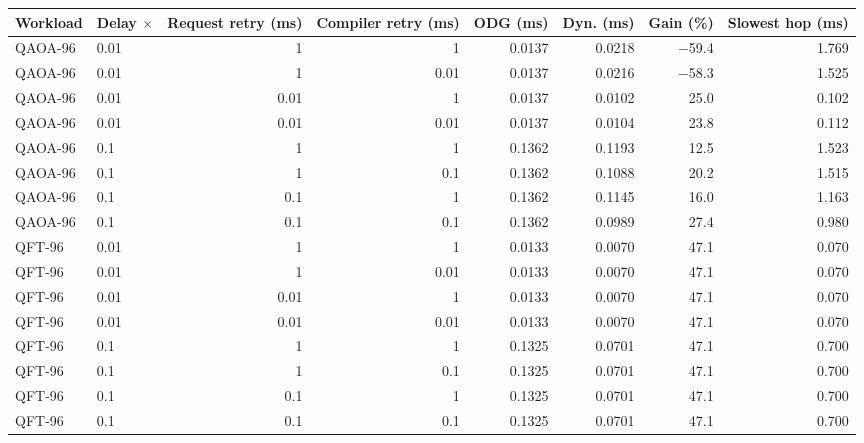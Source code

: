 \begin{tabular}{llrrrrrr}
\toprule
Workload & Delay $\times$ & Request retry (ms) & Compiler retry (ms) & ODG (ms) & Dyn. (ms) & Gain (\%) & Slowest hop (ms) \\
\midrule
QAOA-96 & 0.01 & 1 & 1 & 0.0137 & 0.0218 & $-$59.4 & 1.769 \\
QAOA-96 & 0.01 & 1 & 0.01 & 0.0137 & 0.0216 & $-$58.3 & 1.525 \\
QAOA-96 & 0.01 & 0.01 & 1 & 0.0137 & 0.0102 & 25.0 & 0.102 \\
QAOA-96 & 0.01 & 0.01 & 0.01 & 0.0137 & 0.0104 & 23.8 & 0.112 \\
QAOA-96 & 0.1 & 1 & 1 & 0.1362 & 0.1193 & 12.5 & 1.523 \\
QAOA-96 & 0.1 & 1 & 0.1 & 0.1362 & 0.1088 & 20.2 & 1.515 \\
QAOA-96 & 0.1 & 0.1 & 1 & 0.1362 & 0.1145 & 16.0 & 1.163 \\
QAOA-96 & 0.1 & 0.1 & 0.1 & 0.1362 & 0.0989 & 27.4 & 0.980 \\
QFT-96 & 0.01 & 1 & 1 & 0.0133 & 0.0070 & 47.1 & 0.070 \\
QFT-96 & 0.01 & 1 & 0.01 & 0.0133 & 0.0070 & 47.1 & 0.070 \\
QFT-96 & 0.01 & 0.01 & 1 & 0.0133 & 0.0070 & 47.1 & 0.070 \\
QFT-96 & 0.01 & 0.01 & 0.01 & 0.0133 & 0.0070 & 47.1 & 0.070 \\
QFT-96 & 0.1 & 1 & 1 & 0.1325 & 0.0701 & 47.1 & 0.700 \\
QFT-96 & 0.1 & 1 & 0.1 & 0.1325 & 0.0701 & 47.1 & 0.700 \\
QFT-96 & 0.1 & 0.1 & 1 & 0.1325 & 0.0701 & 47.1 & 0.700 \\
QFT-96 & 0.1 & 0.1 & 0.1 & 0.1325 & 0.0701 & 47.1 & 0.700 \\
\bottomrule
\end{tabular}
